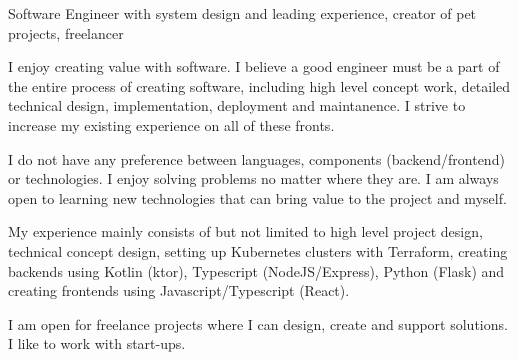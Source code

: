 


\begin{cvparagraph}

Software Engineer with system design and leading experience, creator of pet projects, freelancer

I enjoy creating value with software. I believe a good engineer must be a part of the entire process of creating software, including high level concept work, detailed technical design, implementation, deployment and maintanence. I strive to increase my existing experience on all of these fronts.

I do not have any preference between languages, components (backend/frontend) or technologies. I enjoy solving problems no matter where they are. I am always open to learning new technologies that can bring value to the project and myself.

My experience mainly consists of but not limited to high level project design, technical concept design, setting up Kubernetes clusters with Terraform, creating backends using Kotlin (ktor), Typescript (NodeJS/Express), Python (Flask) and creating frontends using Javascript/Typescript (React).

I am open for freelance projects where I can design, create and support solutions. I like to work with start-ups.

\end{cvparagraph}